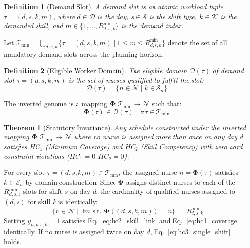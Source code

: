 \documentclass[10pt,journal,compsoc]{IEEEtran}
\newtheorem{theorem}{Theorem}
\newtheorem{definition}{Definition}
\newenvironment{proof}{\begin{IEEEproof}}{\end{IEEEproof}}
\begin{document}
\begin{definition}[Demand Slot]
A demand slot is an atomic workload tuple $\tau = (d, s, k, m)$, where $d \in \mathcal{D}$ is the day, $s \in \mathcal{S}$ is the shift type, $k \in \mathcal{K}$ is the demanded skill, and $m \in \{1, \dots, R_{d,s,k}^{\min}\}$ is the demand index.
\end{definition}

Let $\mathcal{T}_{\min} = \bigcup_{d,s,k} \{\tau = (d, s, k, m) \mid 1 \le m \le R_{d,s,k}^{\min}\}$ denote the set of all mandatory demand slots across the planning horizon.

\begin{definition}[Eligible Worker Domain]
The eligible domain $\mathcal{D}(\tau)$ of demand slot $\tau = (d, s, k, m)$ is the set of nurses qualified to fulfill the slot:
\begin{equation}
\mathcal{D}(\tau) = \{n \in \mathcal{N} \mid k \in \mathcal{S}_n\}
\end{equation}
\end{definition}

The inverted genome is a mapping $\mathbf{\Phi}: \mathcal{T}_{\min} \to \mathcal{N}$ such that:
\begin{equation}
\mathbf{\Phi}(\tau) \in \mathcal{D}(\tau) \quad \forall \tau \in \mathcal{T}_{\min}
\end{equation}

\begin{theorem}[Statutory Invariance]
Any schedule constructed under the inverted mapping $\mathbf{\Phi}: \mathcal{T}_{\min} \to \mathcal{N}$ where no nurse is assigned more than once on any day $d$ satisfies $HC_1$ (Minimum Coverage) and $HC_2$ (Skill Competency) with zero hard constraint violations ($HC_1 = 0, HC_2 = 0$).
\end{theorem}

\begin{proof}
For every slot $\tau = (d, s, k, m) \in \mathcal{T}_{\min}$, the assigned nurse $n = \mathbf{\Phi}(\tau)$ satisfies $k \in \mathcal{S}_n$ by domain construction. Since $\mathbf{\Phi}$ assigns distinct nurses to each of the $R_{d,s,k}^{\min}$ slots for shift $s$ on day $d$, the cardinality of qualified nurses assigned to $(d, s)$ for skill $k$ is identically:
\begin{equation}
|\{n \in \mathcal{N} \mid \exists m \text{ s.t. } \mathbf{\Phi}((d,s,k,m)) = n\}| = R_{d,s,k}^{\min}
\end{equation}
Setting $y_{n,d,s,k} = 1$ satisfies Eq.~\eqref{eq:hc2_skill_link} and Eq.~\eqref{eq:hc1_coverage} identically. If no nurse is assigned twice on day $d$, Eq.~\eqref{eq:hc3_single_shift} holds.
\end{proof}
\end{document}
